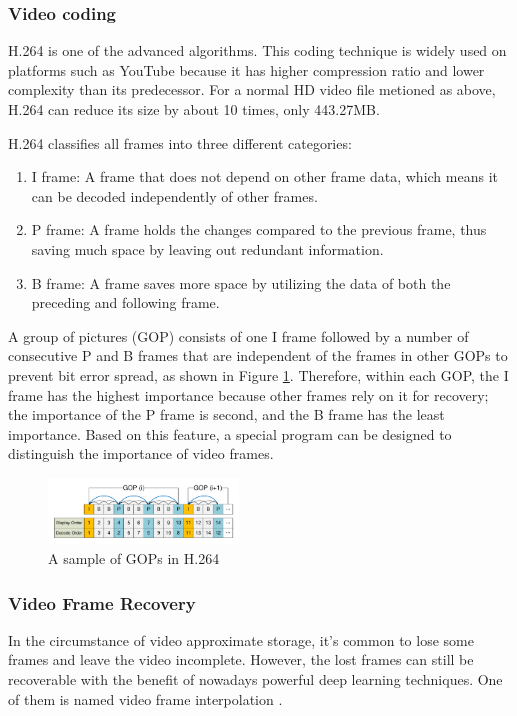 \documentclass[sigconf]{acmart}
\begin{document}
\subsubsection{Video coding}
H.264 \cite{wiegand2003overview} is one of the advanced algorithms. This coding technique is widely used on platforms such as YouTube because it has higher compression ratio and lower complexity than its predecessor. For a normal HD video file metioned as above, H.264 can reduce its size by about 10 times, only 443.27MB.

H.264 classifies all frames into three different categories:
\begin{enumerate}
    \item I frame: A frame that does not depend on other frame data, which means it can be decoded independently of other frames.
    \item P frame: A frame holds the changes compared to the previous frame, thus saving much space by leaving out redundant information.
    \item B frame: A frame saves more space by utilizing the data of both the preceding and following frame.
\end{enumerate}
A group of pictures (GOP) consists of one I frame followed by a number of consecutive P and B frames that are independent of the frames in other GOPs to prevent bit error spread, as shown in Figure \ref{H264-IPB}.
Therefore, within each GOP, the I frame has the highest importance because other frames rely on it for recovery; the importance of the P frame is second, and the B frame has the least importance. Based on this feature, a special program can be designed to distinguish the importance of video frames.

\begin{figure}[ht]
\centering
\includegraphics[width=0.45\textwidth]{photo/H264_IPB.pdf}
\caption{A sample of GOPs in H.264}
\label{H264-IPB}
\end{figure}

\subsubsection{Video Frame Recovery}
In the circumstance of video approximate storage, it's common to lose some frames and leave the video incomplete. However, the lost frames can still be recoverable with the benefit of nowadays powerful deep learning techniques. One of them is named video frame interpolation \cite{meyer2015phase, niklaus2018context}.
\end{document}
